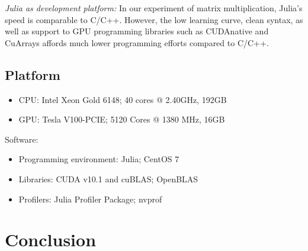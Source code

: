 \documentclass[9pt,twocolumn,twoside,lineno]{gsag3jnl}
\begin{document}
      {\em Julia as development platform:} In our experiment
of matrix multiplication, Julia's speed is comparable to C/C++.
However, the low learning curve, clean syntax, as well as
support to GPU programming libraries such as CUDAnative and
CuArrays affords much lower programming efforts compared to
C/C++.



\subsection{Platform}
 \begin{itemize}
	\item CPU: Intel Xeon Gold 6148; 40 cores @ 2.40GHz, 192GB 
	\item GPU: Tesla V100-PCIE; 5120 Cores @ 1380 MHz, 16GB
\end{itemize}
Software: 
\begin{itemize}
	\item Programming environment: Julia; CentOS 7
	\item Libraries: CUDA v10.1 and cuBLAS; OpenBLAS
	\item Profilers: Julia Profiler Package; nvprof
\end{itemize}



\section{Conclusion}



\end{document}
